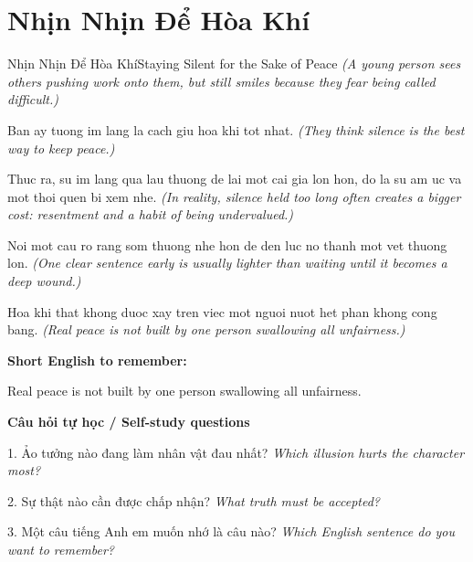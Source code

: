 \section{Nhịn Nhịn Để Hòa Khí}
\begin{truyen}{Nhịn Nhịn Để Hòa Khí}{Staying Silent for the Sake of Peace}
\textit{(A young person sees others pushing work onto them, but still smiles because they fear being called difficult.)}

Ban ay tuong im lang la cach giu hoa khi tot nhat.
\textit{(They think silence is the best way to keep peace.)}

Thuc ra, su im lang qua lau thuong de lai mot cai gia lon hon, do la su am uc va mot thoi quen bi xem nhe.
\textit{(In reality, silence held too long often creates a bigger cost: resentment and a habit of being undervalued.)}

Noi mot cau ro rang som thuong nhe hon de den luc no thanh mot vet thuong lon.
\textit{(One clear sentence early is usually lighter than waiting until it becomes a deep wound.)}

\end{truyen}

\begin{baihoc}
Hoa khi that khong duoc xay tren viec mot nguoi nuot het phan khong cong bang.
\textit{(Real peace is not built by one person swallowing all unfairness.)}
\end{baihoc}

\begin{ghinhoanh}
\textbf{Short English to remember:}

Real peace is not built by one person swallowing all unfairness.

\end{ghinhoanh}

\begin{tuhocnhanh}
\textbf{Câu hỏi tự học / Self-study questions}

1. Ảo tưởng nào đang làm nhân vật đau nhất? \textit{Which illusion hurts the character most?}

2. Sự thật nào cần được chấp nhận? \textit{What truth must be accepted?}

3. Một câu tiếng Anh em muốn nhớ là câu nào? \textit{Which English sentence do you want to remember?}
\end{tuhocnhanh}
\ngancach

